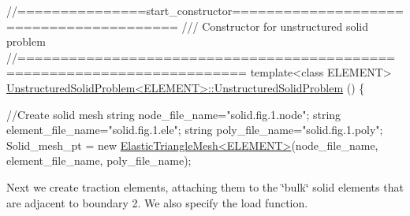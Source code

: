 \begin{DoxyCodeInclude}
\textcolor{comment}{//===============start\_constructor========================================}
\textcolor{comment}{/// Constructor for unstructured solid problem}
\textcolor{comment}{}\textcolor{comment}{//========================================================================}
\textcolor{keyword}{template}<\textcolor{keyword}{class} ELEMENT>
\hyperlink{classUnstructuredSolidProblem_a18ce02b6e4bbc86403c9e1b32c095772}{UnstructuredSolidProblem<ELEMENT>::UnstructuredSolidProblem}
      ()
\{  

 \textcolor{comment}{//Create solid mesh}
 \textcolor{keywordtype}{string} node\_file\_name=\textcolor{stringliteral}{"solid.fig.1.node"};
 \textcolor{keywordtype}{string} element\_file\_name=\textcolor{stringliteral}{"solid.fig.1.ele"};
 \textcolor{keywordtype}{string} poly\_file\_name=\textcolor{stringliteral}{"solid.fig.1.poly"}; 
 Solid\_mesh\_pt = \textcolor{keyword}{new} \hyperlink{classElasticTriangleMesh}{ElasticTriangleMesh<ELEMENT>}(node\_file\_name,
                                                  element\_file\_name,
                                                  poly\_file\_name);

\end{DoxyCodeInclude}


Next we create traction elements, attaching them to the \char`\"{}bulk\char`\"{} solid elements that are adjacent to boundary 2. We also specify the load function.


